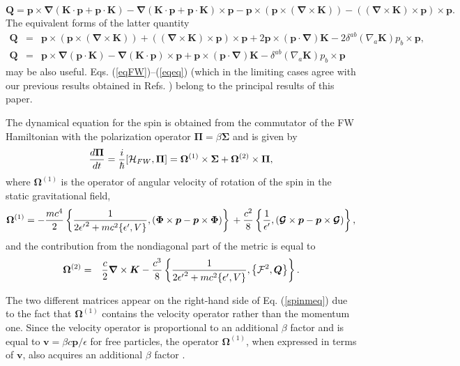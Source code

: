 \documentclass[preprint,showpacs,preprintnumbers,eqsecnum,amsmath,amssymb]{revtex4}
\begin{document}
\begin{equation}
\bm Q=\bm p\times\bm\nabla\left(\bm K\!\cdot\!\bm p+\bm
p\cdot\!\bm K\right) -\bm\nabla\left(\bm K\!\cdot\!\bm p+\bm
p\cdot\!\bm K\right)\times\bm p -\bm p\times(\bm
p\times(\bm\nabla\times\bm K))-((\bm\nabla\times\bm K)\times \bm
p)\times\bm p.\label{eqq}
\end{equation}
The equivalent forms of the latter quantity
\begin{eqnarray}
\bm Q&=&\bm p\times(\bm p\times(\bm\nabla\times\bm
K))+((\bm\nabla\times\bm K) \times\bm p)\times\bm p+2\bm
p\times(\bm p\cdot\bm\nabla)\bm K-2\delta^{ab}
(\nabla_a\bm K)p_b\times\bm p,\nonumber\\
\bm Q&=&\bm p\times\bm\nabla(\bm p\cdot\bm K)-\bm\nabla(\bm
K\cdot\bm p)\times \bm p +\bm p\times(\bm p\cdot\bm\nabla)\bm
K-\delta^{ab}(\nabla_a\bm K)p_b\times\bm p\label{eqeq}
\end{eqnarray}
may be also useful. Eqs. (\ref{eqFW})--(\ref{eqeq}) (which in the
limiting cases agree with our previous results obtained in Refs.
\cite{PRD,PRD2,OST}) belong to the principal results of this paper.

The dynamical equation for the spin is obtained from the
commutator of the FW Hamiltonian with the polarization operator
$\bm\Pi=\beta\bm\Sigma$ and is given by
\begin{equation}
\frac{d\bm \Pi}{dt}=\frac{i}{\hbar}[{\cal H}_{FW},\bm \Pi]=\bm\Omega^{(1)}
\times\bm \Sigma+\bm\Omega^{(2)}\times\bm\Pi,\label{spinmeq}
\end{equation}
where $\bm\Omega^{(1)}$ is the operator of angular velocity of
rotation of the spin in the static gravitational field,
\begin{equation}
\bm\Omega^{(1)}=-\frac{mc^4}{2}\left\{\frac{1}{2{\epsilon'}^2+mc^2\{\epsilon',
V\}},(\bm\Phi\times\bm{p}-\bm{p}\times\bm\Phi)\right\}\\
+ \frac{c^2}{8}\left\{ \frac{1}{\epsilon' },(\mbox{\boldmath${\cal G}$}
\times\bm p- \bm{p}\times\mbox{\boldmath ${\cal G}$})\right\},\label{eqol}
\end{equation}
and the contribution from the nondiagonal part of the metric is equal to
\begin{eqnarray}
\bm\Omega^{(2)} &=&\frac{c}{2} \bm\nabla\times\bm K - \frac{c^3}{8}\left\{
\frac{1}{2{\epsilon'}^2+mc^2\{\epsilon',V\}},\left\{{\cal F}^2,\bm
Q\right\} \right\}. \label{finalOmega}
\end{eqnarray}

The two different matrices appear on the right-hand side of Eq.
(\ref{spinmeq}) due to the fact that $\bm\Omega^{(1)}$ contains
the velocity operator rather than the momentum one. Since the
velocity operator is proportional to an additional $\beta$ factor
and is equal to $\bm v = \beta c\bm p/\epsilon$ for free
particles, the operator $\bm\Omega^{(1)}$, when expressed in terms
of $\bm v$, also acquires an additional $\beta$ factor \cite{OST}.
\end{document}
